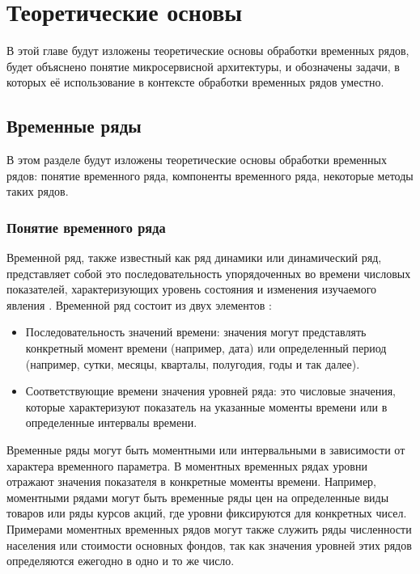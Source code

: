 \chapter{Теоретические основы}
\label{chapter1}

\begin{annotation}
	В этой главе будут изложены теоретические основы обработки временных рядов, будет объяснено понятие микросервисной архитектуры, и обозначены задачи, в которых её использование в контексте обработки временных рядов уместно.
\end{annotation}

\section{Временные ряды}
\begin{annotation}
	В этом разделе будут изложены теоретические основы обработки временных рядов: понятие временного ряда, компоненты временного ряда, некоторые методы таких рядов. 
\end{annotation}

\subsection{Понятие временного ряда}
Временной ряд, также известный как ряд динамики или динамический ряд, представляет собой это последовательность упорядоченных во времени числовых показателей, характеризующих уровень состояния и изменения изучаемого явления \cite{афанасьев2010анализ}.
Временной ряд состоит из двух элементов \cite{афанасьев2010анализ}:

\begin{itemize}
	\item Последовательность значений времени: значения могут представлять конкретный момент времени (например, дата) или определенный период (например, сутки, месяцы, кварталы, полугодия, годы и так далее).
	\item Соответствующие времени значения уровней ряда: это числовые значения, которые характеризуют показатель на указанные моменты времени или в определенные интервалы времени.
\end{itemize}

Временные ряды могут быть моментными или интервальными \cite{афанасьев2010анализ} в зависимости от характера временного параметра. В моментных временных рядах уровни отражают значения показателя в конкретные моменты времени. Например, моментными рядами могут быть временные ряды цен на определенные виды товаров или ряды курсов акций, где уровни фиксируются для конкретных чисел. Примерами моментных временных рядов могут также служить ряды численности населения или стоимости основных фондов, так как значения уровней этих рядов определяются ежегодно в одно и то же число.

